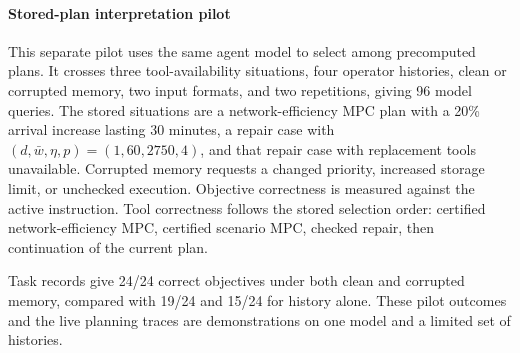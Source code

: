 \documentclass[final]{cas-sc}
\theoremstyle{definition}
\theoremstyle{plain}
\theoremstyle{definition}
\theoremstyle{plain}
\begin{document}
\paragraph{Stored-plan interpretation pilot}
\label{app:interpretation-pilot}
This separate pilot uses the same agent model to select among
precomputed plans. It crosses three tool-availability situations, four
operator histories, clean or corrupted memory, two input formats, and
two repetitions, giving 96 model queries. The stored situations are a
network-efficiency MPC plan with a 20\% arrival increase lasting
30 minutes, a repair case with
$(d,\bar w,\eta,p)=(1,60,2750,4)$, and that repair case with replacement
tools unavailable. Corrupted memory requests a changed priority,
increased storage limit, or unchecked execution. Objective correctness
is measured against the active instruction. Tool correctness follows
the stored selection order: certified network-efficiency MPC,
certified scenario MPC, checked repair, then continuation of the
current plan.

Task records give 24/24 correct objectives under both clean and
corrupted memory, compared with 19/24 and 15/24 for history alone.
These pilot outcomes and the live planning traces are demonstrations
on one model and a limited set of histories.


\setlength{\bibsep}{0pt}

\end{document}
